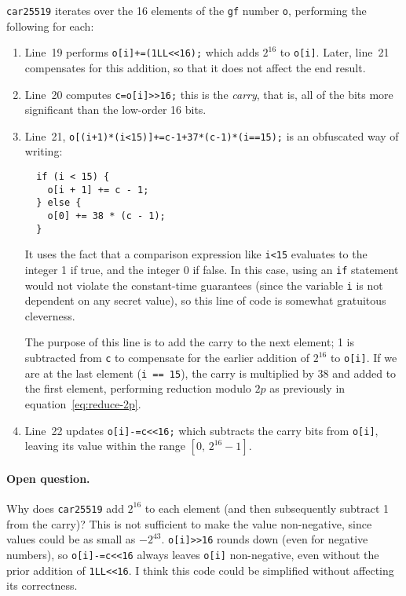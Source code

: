 \documentclass{article}
\begin{document}

\verb|car25519| iterates over the 16 elements of the \verb|gf| number \verb|o|, performing the following for each:
\begin{enumerate}
\item Line~19 performs \verb|o[i]+=(1LL<<16);| which adds $2^{16}$ to \verb|o[i]|.
    Later, line~21 compensates for this addition, so that it does not affect the end result.

\item Line~20 computes \verb|c=o[i]>>16;| this is the \emph{carry}, that is, all of the bits more significant than the low-order 16 bits.

\item Line~21, \verb|o[(i+1)*(i<15)]+=c-1+37*(c-1)*(i==15);| is an obfuscated way of writing:
\begin{verbatim}
  if (i < 15) {
    o[i + 1] += c - 1;
  } else {
    o[0] += 38 * (c - 1);
  }
\end{verbatim}
It uses the fact that a comparison expression like \verb|i<15| evaluates to the integer 1 if true, and the integer 0 if false.
In this case, using an \verb|if| statement would not violate the constant-time guarantees (since the variable \verb|i| is not dependent on any secret value), so this line of code is somewhat gratuitous cleverness.

    The purpose of this line is to add the carry to the next element; 1 is subtracted from \verb|c| to compensate for the earlier addition of $2^{16}$ to \verb|o[i]|.
    If we are at the last element (\verb|i == 15|), the carry is multiplied by 38 and added to the first element, performing reduction modulo $2p$ as previously in equation~\eqref{eq:reduce-2p}.

\item Line~22 updates \verb|o[i]-=c<<16;| which subtracts the carry bits from \verb|o[i]|, leaving its value within the range $[0,\, 2^{16}-1]$.
\end{enumerate}

\paragraph{Open question.}
Why does \verb|car25519| add $2^{16}$ to each element (and then subsequently subtract 1 from the carry)?
This is not sufficient to make the value non-negative, since values could be as small as $-2^{43}$.
\verb|o[i]>>16| rounds down (even for negative numbers), so \verb|o[i]-=c<<16| always leaves \verb|o[i]| non-negative, even without the prior addition of \verb|1LL<<16|.
I think this code could be simplified without affecting its correctness.
\vspace{1pt}
\end{document}
